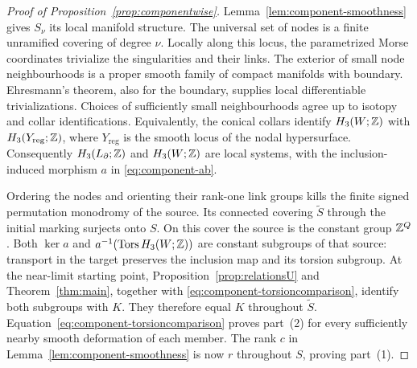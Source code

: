 \begin{proof}[Proof of Proposition~\ref{prop:componentwise}]
Lemma~\ref{lem:component-smoothness} gives $S_\nu$ its local manifold structure.
The universal set of nodes is a finite unramified covering of degree
$\nu$. Locally along this locus, the parametrized Morse coordinates
trivialize the singularities and their links. The exterior of small
node neighbourhoods is a proper smooth family of compact manifolds
with boundary. Ehresmann's theorem, also for the boundary, supplies
local differentiable trivializations. Choices of sufficiently small
neighbourhoods agree up to isotopy and collar identifications. Equivalently,
the conical collars identify $H_3(W;\mathbb Z)$ with
$H_3(Y_{\mathrm{reg}};\mathbb Z)$, where $Y_{\mathrm{reg}}$ is the smooth locus
of the nodal hypersurface.
Consequently $H_3(L_\partial;\mathbb Z)$ and $H_3(W;\mathbb Z)$ are local systems,
with the inclusion-induced morphism $a$ in \eqref{eq:component-ab}.

Ordering the nodes and orienting their rank-one link groups kills the
finite signed permutation monodromy of the source. Its connected
covering $\widetilde S$ through the initial marking surjects onto $S$.
On this cover the source is the constant group $\mathbb Z^Q$.
Both $\ker a$ and $a^{-1}(\operatorname{Tors} H_3(W;\mathbb Z))$ are constant subgroups
of that source: transport in the target preserves the inclusion map
and its torsion subgroup.
At the near-limit starting point, Proposition~\ref{prop:relationsU} and Theorem~\ref{thm:main}, together with \eqref{eq:component-torsioncomparison}, identify both
subgroups with $K$. They therefore equal $K$ throughout
$\widetilde S$. Equation~\eqref{eq:component-torsioncomparison} proves part~(2)
for every sufficiently nearby smooth deformation of each member.
The rank $c$ in Lemma~\ref{lem:component-smoothness} is now $r$ throughout $S$,
proving part~(1).


\end{proof}
